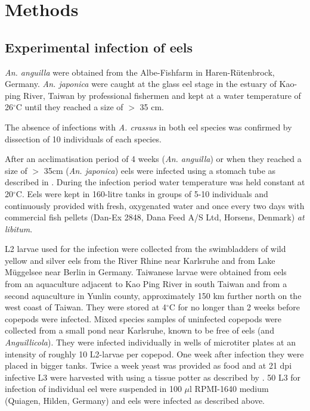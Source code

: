 




\section{Methods}

\subsection{Experimental infection of eels}

\textit{An. anguilla} were obtained from the Albe-Fishfarm in
Haren-R\"utenbrock, Germany. \textit{An. japonica} were caught at the
glass eel stage in the estuary of Kao-ping River, Taiwan by
professional fishermen and kept at a water temperature of
26$^{\circ}$C until they reached a size of $>$ 35 cm.

The absence of infections with \textit{A. crassus} in both eel species
was confirmed by dissection of 10 individuals of each species.

After an acclimatisation period of 4 weeks (\textit{An. anguilla}) or
when they reached a size of $>$ 35cm (\textit{An. japonica}) eels were
infected using a stomach tube as described in
\cite{boon1990effect}. During the infection period water temperature
was held constant at 20$^{\circ}$C. Eels were kept in 160-litre tanks
in groups of 5-10 individuals and continuously provided with fresh,
oxygenated water and once every two days with commercial fish pellets
(Dan-Ex 2848, Dana Feed A/S Ltd, Horsens, Denmark) \textit{at
  libitum}.

L2 larvae used for the infection were collected from the swimbladders
of wild yellow and silver eels from the River Rhine near Karlsruhe and
from Lake M\"uggelsee near Berlin in Germany. Taiwanese larvae were
obtained from eels from an aquaculture adjacent to Kao Ping River in
south Taiwan and from a second aquaculture in Yunlin county,
approximately 150 km further north on the west coast of Taiwan. They
were stored at 4$^{\circ}$C for no longer than 2 weeks before copepods
were infected. Mixed species samples of uninfected copepods were
collected from a small pond near Karlsruhe, known to be free of eels
(and \textit{Anguillicola}). They were infected individually in wells
of microtiter plates at an intensity of roughly 10 L2-larvae per
copepod. One week after infection they were placed in bigger
tanks. Twice a week yeast was provided as food and at 21 dpi infective
L3 were harvested with using a tissue potter as described by
\cite{haenen_improved_1994}. 50 L3 for infection of individual eel
were suspended in 100 $\mu$l RPMI-1640 medium (Quiagen, Hilden,
Germany) and eels were infected as described above.

